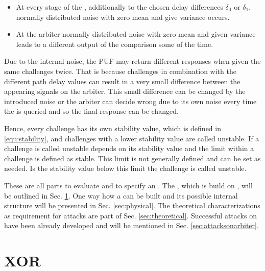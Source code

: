 \begin{itemize}
\item At every stage of the \apuf, additionally to the chosen delay differences $\delta_0$ or $\delta_1$, normally distributed noise with zero mean and give variance occurs.
\item At the arbiter normally distributed noise with zero mean and given variance leads to a different output of the comparison some of the time.
\end{itemize}

Due to the internal noise, the PUF may return different responses when given the same challenges twice.
That is because challenges in combination with the different path delay values can result in a very small difference between the appearing signals on the arbiter. %
This small difference can be changed by the introduced noise or the arbiter can decide wrong due to its own noise every time the \apuf is queried and so the final response can be changed. %

Hence, every challenge has its own stability value, which is defined in \ref{equ:stability}, and challenges with a lower stability value are called unstable.
If a challenge is called unstable depends on its stability value and the limit within a challenge is defined as stable.
This limit is not generally defined and can be set as needed.
Is the stability value below this limit the challenge is called unstable.

These are all parts to evaluate and to specify an \apuf.
The \xpuf, which is build on \apufs, will be outlined in Sec. \ref{sec:xorarbiterpufs}.
One way how a \apuf can be built and its possible internal structure will be presented in Sec. \ref{sec:physical}.
The theoretical characterizations as requirement for attacks are part of Sec. \ref{sec:theoretical}.
Successful attacks on \apufs have been already developed and will be mentioned in Sec. \ref{sec:attacksonarbiter}.


\section{\acs{XOR} \apufs}
\label{sec:xorarbiterpufs}

